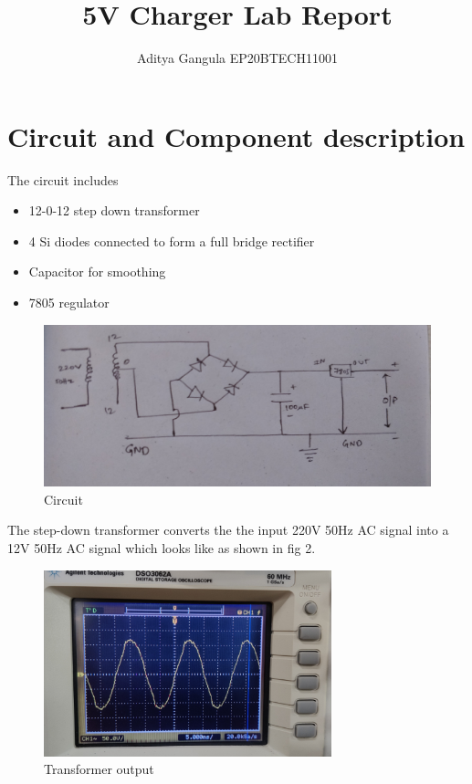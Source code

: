 \documentclass{article}
\title{5V Charger Lab Report}
\author{Aditya Gangula EP20BTECH11001}
\begin{document}
\maketitle

\section*{Circuit and Component description}
The circuit includes
\begin{itemize}
    \item 12-0-12 step down transformer
    \item 4 Si diodes connected to form a full bridge rectifier
    \item Capacitor for smoothing
    \item 7805 regulator
\end{itemize}
\begin{figure}
    \centering
    \includegraphics[width=\columnwidth]{figs/circuit.png}
    \caption{Circuit}
    \label{fig:circ}
\end{figure}
The step-down transformer converts the the input 220V 50Hz AC signal into a 12V 50Hz AC signal which looks like as shown in fig 2.\\
\begin{figure}[!h]
    \centering
    \includegraphics[width=\columnwidth]{figs/trans.png}
    \caption{Transformer output}
    \label{fig:my_label}
\end{figure}
\end{document}
